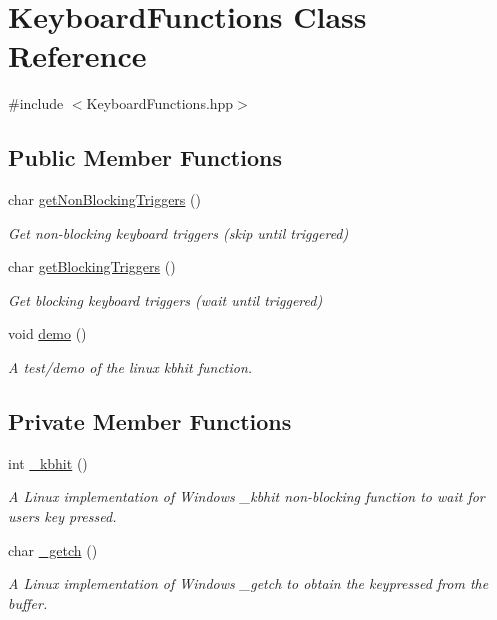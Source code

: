\hypertarget{class_keyboard_functions}{}\section{Keyboard\+Functions Class Reference}
\label{class_keyboard_functions}


{\ttfamily \#include $<$Keyboard\+Functions.\+hpp$>$}

\subsection*{Public Member Functions}
\begin{DoxyCompactItemize}
\item 
char \mbox{\hyperlink{class_keyboard_functions_a7dc688d2e10e9fbbf8bb2ad5e0e163d9}{get\+Non\+Blocking\+Triggers}} ()
\begin{DoxyCompactList}\small\item\em Get non-\/blocking keyboard triggers (skip until triggered) \end{DoxyCompactList}\item 
char \mbox{\hyperlink{class_keyboard_functions_a3c4c4c3032f1dfaafb5d844920f95994}{get\+Blocking\+Triggers}} ()
\begin{DoxyCompactList}\small\item\em Get blocking keyboard triggers (wait until triggered) \end{DoxyCompactList}\item 
void \mbox{\hyperlink{class_keyboard_functions_a22c23d2cbca56599768a5ceac94cbb0b}{demo}} ()
\begin{DoxyCompactList}\small\item\em A test/demo of the linux kbhit function. \end{DoxyCompactList}\end{DoxyCompactItemize}
\subsection*{Private Member Functions}
\begin{DoxyCompactItemize}
\item 
int \mbox{\hyperlink{class_keyboard_functions_abead7b07445b65c4b01d613823d2f8ce}{\+\_\+kbhit}} ()
\begin{DoxyCompactList}\small\item\em A Linux implementation of Windows \+\_\+kbhit non-\/blocking function to wait for user\textquotesingle{}s key pressed. \end{DoxyCompactList}\item 
char \mbox{\hyperlink{class_keyboard_functions_acdaa4ed7d68dd3faf4103fc8112c768b}{\+\_\+getch}} ()
\begin{DoxyCompactList}\small\item\em A Linux implementation of Windows \+\_\+getch to obtain the keypressed from the buffer. \end{DoxyCompactList}\end{DoxyCompactItemize}


